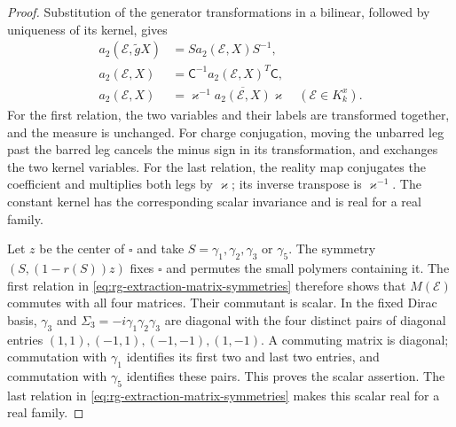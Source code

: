 \begin{proof}
Substitution of the generator transformations in a bilinear,
followed by uniqueness of its kernel, gives
\begin{equation}\label{eq:rg-extraction-matrix-symmetries}
 \begin{split}
 a_2(\mathscr E,\tilde gX)&=S a_2(\mathscr E,X)S^{-1},\\
 a_2(\mathscr E,X)&=\mathsf C^{-1}a_2(\mathscr E,X)^T\mathsf C,\\
 a_2(\mathscr E,X)&=\varkappa^{-1}
                         \overline{a_2(\mathscr E,X)}\varkappa
                                                   \quad(\mathscr E\in K_k^x).
 \end{split}
\end{equation}
For the first relation, the two variables and their labels
are transformed together, and the measure is unchanged.
For charge conjugation, moving the unbarred leg past the barred
leg cancels the minus sign in its transformation, and exchanges
the two kernel variables. For the last relation, the reality
map conjugates the coefficient and multiplies both legs by
$\varkappa$; its inverse transpose is $\varkappa^{-1}$.
The constant kernel has the corresponding scalar invariance
and is real for a real family.

Let $z$ be the center of $\square$ and take
$S=\gamma_1,\gamma_2,\gamma_3$ or $\gamma_5$.
The symmetry $(S,(1-r(S))z)$ fixes $\square$ and permutes the
small polymers containing it. The first relation in
\eqref{eq:rg-extraction-matrix-symmetries} therefore shows that
$M(\mathscr E)$ commutes with all four matrices. Their commutant
is scalar. In the fixed Dirac basis, $\gamma_3$ and
$\Sigma_3=-i\gamma_1\gamma_2\gamma_3$ are diagonal with the
four distinct pairs of diagonal entries
$(1,1),(-1,1),(-1,-1),(1,-1)$. A commuting matrix is diagonal;
commutation with $\gamma_1$ identifies its first two and last
two entries, and commutation with $\gamma_5$ identifies these
pairs. This proves the scalar assertion. The last relation in
\eqref{eq:rg-extraction-matrix-symmetries} makes this scalar
real for a real family.


\end{proof}
